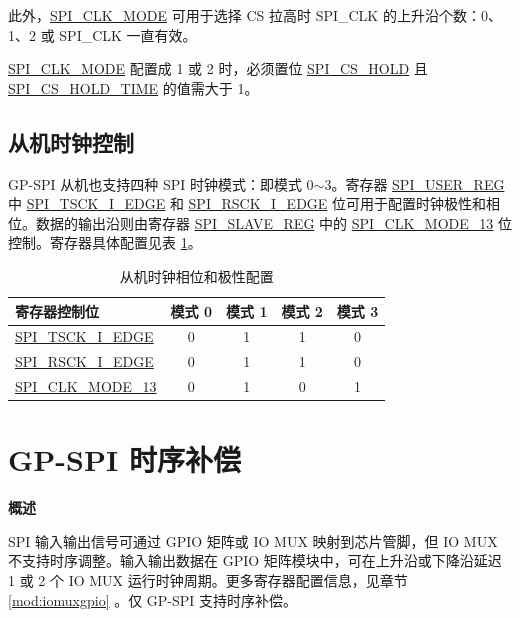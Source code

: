 \documentclass[main\_\_CN.tex]{subfiles}
\begin{document}
此外，\hyperref[fielddesc:SPICLKMODE]{SPI\_CLK\_MODE} 可用于选择 CS 拉高时 SPI\_CLK 的上升沿个数：0、1、2 或 SPI\_CLK 一直有效。 

\begin{tiplisting}
 \hyperref[fielddesc:SPICLKMODE]{SPI\_CLK\_MODE} 配置成 1 或 2 时，必须置位 \hyperref[fielddesc:SPICSHOLD]{SPI\_CS\_HOLD} 且 \hyperref[fielddesc:SPICSHOLDTIME]{SPI\_CS\_HOLD\_TIME} 的值需大于 1。
\end{tiplisting}
\vspace{-1em}

\subsection{从机时钟控制}\label{GP-SPI slave clock control}

GP-SPI 从机也支持四种 SPI 时钟模式：即模式 0$\sim$3。寄存器 \hyperref[regdesc:SPIUSERREG]{SPI\_USER\_REG} 中 \hyperref[fielddesc:SPITSCKIEDGE]{SPI\_TSCK\_I\_EDGE} 和 \hyperref[fielddesc:SPIRSCKIEDGE]{SPI\_RSCK\_I\_EDGE} 位可用于配置时钟极性和相位。数据的输出沿则由寄存器 \hyperref[regdesc:SPISLAVEREG]{SPI\_SLAVE\_REG} 中的 \hyperref[fielddesc:SPICLKMODE13]{SPI\_CLK\_MODE\_13} 位控制。寄存器具体配置见表 \ref{table:clock_pol_slave}。 

\begin{table}[H]
    \centering
    \caption{从机时钟相位和极性配置}
    \label{table:clock_pol_slave}
    \begin{tabular}[c]{|p{3.5cm}|c|c|c|c|}
    \hline
    \rowcolor{lightgray}
    \textbf{寄存器控制位} & \textbf{模式 0} & \textbf{模式 1} & \textbf{模式 2} & \textbf{模式 3}\\
    \hline
 \hyperref[fielddesc:SPITSCKIEDGE]{SPI\_TSCK\_I\_EDGE}   & 0 & 1 & 1 & 0\\
    \hline
 \hyperref[fielddesc:SPIRSCKIEDGE]{SPI\_RSCK\_I\_EDGE}   & 0 & 1 & 1 & 0\\
    \hline
 \hyperref[fielddesc:SPICLKMODE13]{SPI\_CLK\_MODE\_13}     & 0 & 1 & 0 & 1\\
    \hline    
    \end{tabular}
\end{table}


\section{GP-SPI 时序补偿} \label{sec:gp-spi-timing-compensation}

\textbf{概述}

SPI 输入输出信号可通过 GPIO 矩阵或 IO MUX 映射到芯片管脚，但 IO MUX 不支持时序调整。输入输出数据在 GPIO 矩阵模块中，可在上升沿或下降沿延迟 1 或 2 个 IO MUX 运行时钟周期。更多寄存器配置信息，见章节 \ref{mod:iomuxgpio} \textit{}。仅 GP-SPI 支持时序补偿。
\end{document}
